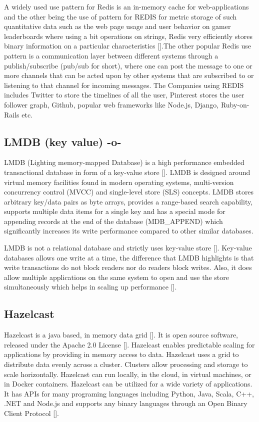 A widely used use pattern for Redis is an in-memory cache for
web-applications and the other being the use of pattern for REDIS for
metric storage of such quantitative data such as the web page usage
and user behavior on gamer leaderboards where using a bit operations
on strings, Redis very efficiently stores binary information on a
particular characteristics [\cite{redis-book-2016}].The other popular
Redis use pattern is a communication layer between different systems
through a publish/subscribe (pub/sub for short), where one can post
the message to one or more channels that can be acted upon by other
systems that are subscribed to or listening to that channel for
incoming messages. The Companies using REDIS includes Twitter to store
the timelines of all the user, Pinterest stores the user follower
graph, Github, popular web frameworks like Node.js, Django,
Ruby-on-Rails etc.



\subsection{LMDB (key value) -o-}

LMDB (Lighting memory-mapped Database) is a high performance embedded
transactional database in form of a key-value
store [\cite{www-keyvalue}]. LMDB is designed around virtual memory
facilities found in modern operating systems, multi-version
concurrency control (MVCC) and single-level store (SLS) concepts. LMDB
stores arbitrary key/data pairs as byte arrays, provides a range-based
search capability, supports multiple data items for a single key and
has a special mode for appending records at the end of the database
(MDB\_APPEND) which significantly increases its write performance
compared to other similar databases.

LMDB is not a relational database and strictly uses key-value
store [\cite{www-relationaldb}].  Key-value databases allows one write
at a time, the difference that LMDB highlights is that write
transactions do not block readers nor do readers block writes. Also,
it does allow multiple applications on the same system to open and use
the store simultaneously which helps in scaling up
performance [\cite{www-lmdb}].



\subsection{Hazelcast}

Hazelcast is a java based, in memory data grid [\cite{www-wikihazel}].
It is open source software, released under the Apache 2.0
License [\cite{www-githubhazel}]. Hazelcast enables predictable scaling
for applications by providing in memory access to data.  Hazelcast
uses a grid to distribute data evenly across a cluster. Clusters allow
processing and storage to scale horizontally. Hazelcast can run
locally, in the cloud, in virtual machines, or in Docker
containers. Hazelcast can be utilized for a wide variety of
applications. It has APIs for many programing languages including
Python, Java, Scala, C++, .NET and Node.js and supports any binary
languages through an Open Binary Client Protocol [\cite{www-wikihazel}].

